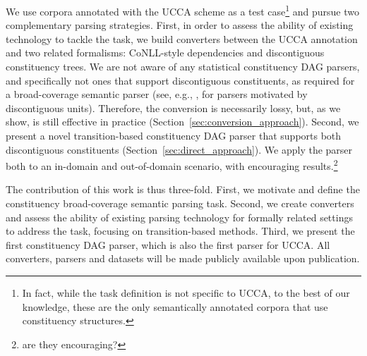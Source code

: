 \documentclass[11pt]{article}
\newcommand{\oa}[1]{\footnote{\color{red} #1}}
\newcommand{\secref}[1]{Section~\ref{#1}}
\begin{document}
We use corpora annotated with the UCCA scheme \cite{abend2013universal} as a test
case\footnote{In fact, while the task definition is not specific to UCCA,
  to the best of our knowledge, these are the only
  semantically annotated corpora that use constituency structures.}
and pursue two complementary parsing strategies.
First, in order to assess the ability of existing technology to tackle the task,
we build converters between the UCCA annotation and two related formalisms:
CoNLL-style dependencies and discontiguous constituency trees.
We are not aware of any statistical constituency DAG parsers, and specifically not
ones that support discontiguous constituents, as required for a broad-coverage semantic
parser (see, e.g., \cite{pitler2015linear,maier2015discontinuous}, for parsers motivated by discontiguous units). Therefore, the conversion is necessarily lossy, but, as we show, is still effective
in practice (\secref{sec:conversion_approach}).
Second, we present a novel transition-based
constituency DAG parser that supports both discontiguous constituents (\secref{sec:direct_approach}). 
We apply the parser both to an in-domain and out-of-domain
scenario, with encouraging results.\oa{are they encouraging?}


The contribution of this work is thus three-fold.
First, we motivate and define the constituency broad-coverage semantic parsing task.
Second, we create converters and assess the ability of existing parsing technology
for formally related settings to address the task, focusing on transition-based methods.
Third, we present the first constituency DAG parser, which is also the
first parser for UCCA. 
All converters, parsers and datasets will be made publicly available upon publication.
\end{document}
